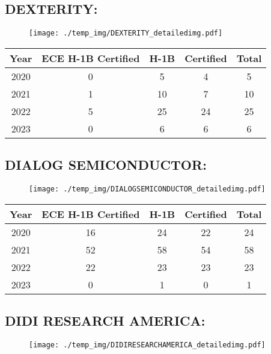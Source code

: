 \documentclass{article}%
\begin{document}
%
\newpage%
\subsection{DEXTERITY:}%
\label{subsec:DEXTERITY}%
\label{DEXTERITYdetailed}%


\begin{figure}[htbp]%
\centering%
\texttt{[image: ./temp\_img/DEXTERITY\_detailedimg.pdf]}%
\end{figure}

%
\begin{longtable}{c|c|c|c|c}%
\hline%
Year&ECE H{-}1B Certified&H{-}1B&Certified&Total\\%
\hline%
2020&0&5&4&5\\%
\hline%
2021&1&10&7&10\\%
\hline%
2022&5&25&24&25\\%
\hline%
2023&0&6&6&6\\%
\hline%
\end{longtable}

%
\newpage%
\subsection{DIALOG SEMICONDUCTOR:}%
\label{subsec:DIALOGSEMICONDUCTOR}%
\label{DIALOGSEMICONDUCTORdetailed}%


\begin{figure}[htbp]%
\centering%
\texttt{[image: ./temp\_img/DIALOGSEMICONDUCTOR\_detailedimg.pdf]}%
\end{figure}

%
\begin{longtable}{c|c|c|c|c}%
\hline%
Year&ECE H{-}1B Certified&H{-}1B&Certified&Total\\%
\hline%
2020&16&24&22&24\\%
\hline%
2021&52&58&54&58\\%
\hline%
2022&22&23&23&23\\%
\hline%
2023&0&1&0&1\\%
\hline%
\end{longtable}

%
\newpage%
\subsection{DIDI RESEARCH AMERICA:}%
\label{subsec:DIDIRESEARCHAMERICA}%
\label{DIDIRESEARCHAMERICAdetailed}%


\begin{figure}[htbp]%
\centering%
\texttt{[image: ./temp\_img/DIDIRESEARCHAMERICA\_detailedimg.pdf]}%
\end{figure}
\end{document}
